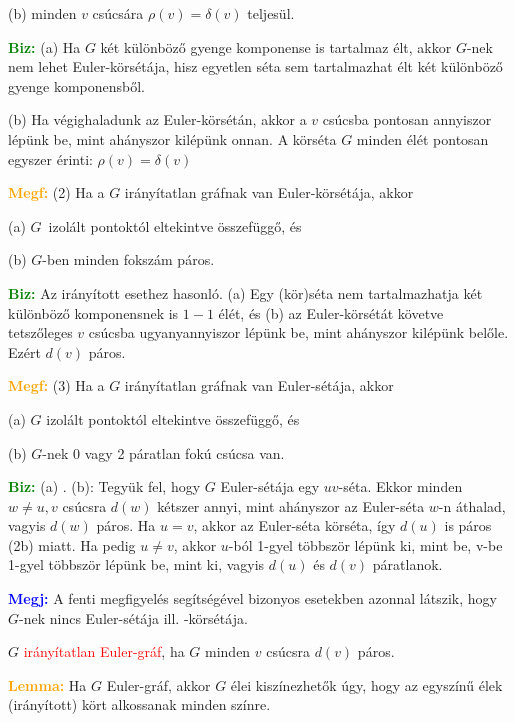 \documentclass[../../szobeli.tex]{subfiles}
\begin{document}
\begin{itemize}
            (b) minden $v$ csúcsára $\rho(v) = \delta(v)$ teljesül.

        \textcolor{green}{\textbf{Biz:}} (a) Ha $G$ két különböző gyenge komponense is tartalmaz élt, akkor $G$-nek nem lehet Euler-körsétája, hisz egyetlen séta sem tartalmazhat élt két különböző gyenge komponensből. \checkmark

        (b) Ha végighaladunk az Euler-körsétán, akkor a $v$ csúcsba pontosan annyiszor lépünk be, mint ahányszor kilépünk onnan. A körséta $G$ minden élét pontosan egyszer érinti: $\rho(v) = \delta(v)$   

        \textcolor{orange}{\textbf{Megf:}} (2) Ha a $G$ irányítatlan gráfnak van Euler-körsétája, akkor 

            (a) $G$ izolált pontoktól eltekintve összefüggő, és

            (b) $G$-ben minden fokszám páros.

        \textcolor{green}{\textbf{Biz:}} Az irányított esethez hasonló. (a) Egy (kör)séta nem tartalmazhatja két különböző komponensnek is $1-1$ élét, és (b) az Euler-körsétát követve tetszőleges $v$ csúcsba ugyanyannyiszor lépünk be, mint ahányszor kilépünk belőle. Ezért $d(v)$ páros.   

        \textcolor{orange}{\textbf{Megf:}} (3) Ha a $G$ irányítatlan gráfnak van Euler-sétája, akkor 

            (a) $G$ izolált pontoktól eltekintve összefüggő, és

            (b) $G$-nek 0 vagy 2 páratlan fokú csúcsa van.

        \textcolor{green}{\textbf{Biz:}} (a) \checkmark. (b): Tegyük fel, hogy $G$ Euler-sétája egy $uv$-séta. Ekkor minden $w \neq u,v$ csúcsra $d(w)$ kétszer annyi, mint ahányszor az Euler-séta $w$-n áthalad, vagyis $d(w)$ páros. Ha $u = v$, akkor az Euler-séta körséta, így $d(u)$ is páros (2b) miatt. Ha pedig $u \neq v$, akkor $u$-ból 1-gyel többször lépünk ki, mint be, v-be 1-gyel többször lépünk be, mint ki, vagyis $d(u)$ és $d(v)$ páratlanok.  

        \textcolor{blue}{\textbf{Megj:}} A fenti megfigyelés segítségével bizonyos esetekben azonnal látszik, hogy $G$-nek nincs Euler-sétája ill. -körsétája.

        $G$ \textcolor{red}{irányítatlan Euler-gráf}, ha $G$ minden $v$ csúcsra $d(v)$ páros.

        \textcolor{orange}{\textbf{Lemma:}} Ha $G$ Euler-gráf, akkor $G$ élei kiszínezhetők úgy, hogy az egyszínű élek (irányított) kört alkossanak minden színre.


\end{itemize}
\end{document}
